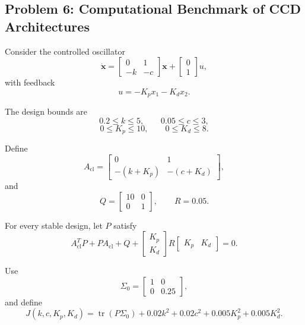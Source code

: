\subsection*{Problem 6: Computational Benchmark of CCD Architectures}

Consider the controlled oscillator
\begin{equation}
\dot{\mathbf{x}}
=
\begin{bmatrix}
0&1\\
-k&-c
\end{bmatrix}
\mathbf{x}
+
\begin{bmatrix}
0\\
1
\end{bmatrix}u,
\end{equation}
with feedback
\begin{equation}
u=-K_p x_1-K_d x_2.
\end{equation}

The design bounds are
\begin{equation}
0.2\leq k\leq5,
\qquad
0.05\leq c\leq3,
\end{equation}
\begin{equation}
0\leq K_p\leq10,
\qquad
0\leq K_d\leq8.
\end{equation}

Define
\begin{equation}
A_{\mathrm{cl}}
=
\begin{bmatrix}
0&1\\
-(k+K_p)&-(c+K_d)
\end{bmatrix},
\end{equation}
and
\begin{equation}
Q=
\begin{bmatrix}
10&0\\
0&1
\end{bmatrix},
\qquad
R=0.05.
\end{equation}

For every stable design, let $P$ satisfy
\begin{equation}
A_{\mathrm{cl}}^TP
+
PA_{\mathrm{cl}}
+
Q
+
\begin{bmatrix}
K_p\\
K_d
\end{bmatrix}
R
\begin{bmatrix}
K_p&K_d
\end{bmatrix}
=
0.
\end{equation}

Use
\begin{equation}
\Sigma_0=
\begin{bmatrix}
1&0\\
0&0.25
\end{bmatrix},
\end{equation}
and define
\begin{equation}
J(k,c,K_p,K_d)
=
\operatorname{tr}(P\Sigma_0)
+
0.02k^2
+
0.02c^2
+
0.005K_p^2
+
0.005K_d^2.
\end{equation}

